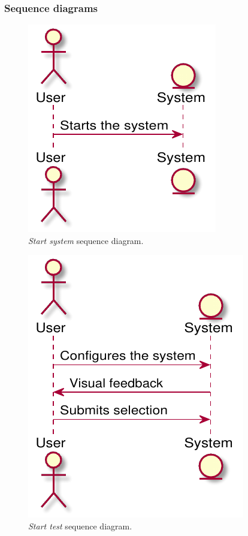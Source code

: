 \subsubsection{Sequence diagrams}
\begin{figure}[h!t]
    \centering
    \includegraphics[scale=0.8]{assets/plantuml/pdf/sequence/system.pdf}
    \caption{\emph{Start system} sequence diagram.}
    \label{fig:sequence:start}
\end{figure}

\begin{figure}[h!t]
    \centering
    \includegraphics[scale=0.8]{assets/plantuml/pdf/sequence/test.pdf}
    \caption{\emph{Start test} sequence diagram.}
    \label{fig:sequence:test}
\end{figure}

